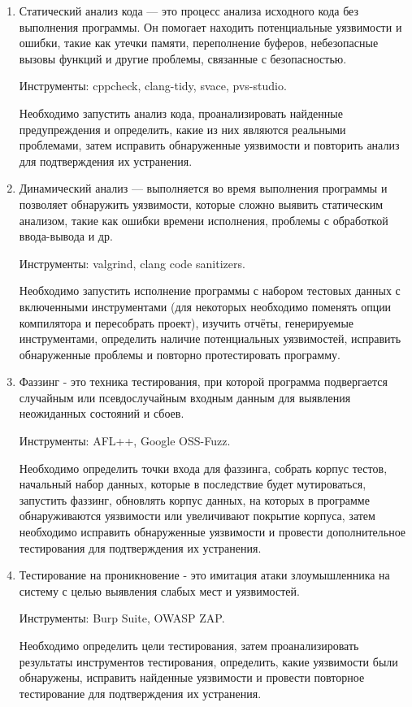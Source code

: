 \begin{enumerate}
    \item Статический анализ кода — это процесс анализа исходного кода без выполнения программы. Он помогает находить потенциальные уязвимости и ошибки, такие как утечки памяти, переполнение буферов, небезопасные вызовы функций и другие проблемы, связанные с безопасностью.

    Инструменты: cppcheck, clang-tidy, svace, pvs-studio.

    Необходимо запустить анализ кода, проанализировать найденные предупреждения и определить, какие из них являются реальными проблемами, затем исправить обнаруженные уязвимости и повторить анализ для подтверждения их устранения.

    \item Динамический анализ — выполняется во время выполнения программы и позволяет обнаружить уязвимости, которые сложно выявить статическим анализом, такие как ошибки времени исполнения, проблемы с обработкой ввода-вывода и др.

    Инструменты: valgrind, clang code sanitizers.

    Необходимо запустить исполнение программы с набором тестовых данных с включенными инструментами (для некоторых необходимо поменять опции компилятора и пересобрать проект), изучить отчёты, генерируемые инструментами, определить наличие потенциальных уязвимостей, исправить обнаруженные проблемы и повторно протестировать программу.

    \item Фаззинг - это техника тестирования, при которой программа подвергается случайным или псевдослучайным входным данным для выявления неожиданных состояний и сбоев.

    Инструменты: AFL++, Google OSS-Fuzz.

    Необходимо определить точки входа для фаззинга, собрать корпус тестов, начальный набор данных, которые в последствие будет мутироваться, запустить фаззинг, обновлять корпус данных, на которых в программе обнаруживаются уязвимости или увеличивают покрытие корпуса, затем необходимо исправить обнаруженные уязвимости и провести дополнительное тестирования для подтверждения их устранения.

    \item Тестирование на проникновение - это имитация атаки злоумышленника на систему с целью выявления слабых мест и уязвимостей.

    Инструменты: Burp Suite, OWASP ZAP.

    Необходимо определить цели тестирования, затем проанализировать результаты инструментов тестирования, определить, какие уязвимости были обнаружены, исправить найденные уязвимости и провести повторное тестирование для подтверждения их устранения.

\end{enumerate}

